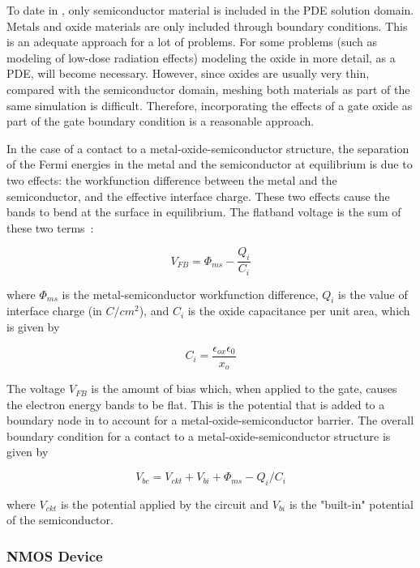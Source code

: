 To date in \Xyce{}, only semiconductor material is included in the PDE
solution domain.  Metals and oxide materials are only included
through boundary conditions.  This is an adequate approach for a lot of
problems.  For some problems (such as modeling of low-dose radiation
effects) modeling the oxide in more detail, as a PDE, will become necessary.
However, since oxides are usually very thin, compared with the
semiconductor domain, meshing both materials as part of the same simulation
is difficult.  Therefore, incorporating the effects of a gate oxide as part
of the gate boundary condition is a reasonable approach.

In the case of a contact to a metal-oxide-semiconductor structure, the
separation of the Fermi energies in the metal and the semiconductor at
equilibrium is due to two effects:  the workfunction difference between the
metal and the semiconductor, and the effective interface charge.  These two
effects cause the bands to bend at the surface in equilibrium.  The
flatband voltage is the sum of these two terms~\cite{streetman}:

\begin{equation}
  V_{FB} = \Phi_{ms} - \frac{Q_{i}}{C_{i}}
\end{equation}

where $\Phi_{ms}$ is the metal-semiconductor workfunction difference,
$Q_{i}$ is the value of interface charge (in $C/cm^{2}$), and $C_{i}$ is the
oxide capacitance per unit area, which is given by

\begin{equation}
  C_{i} = \frac{\epsilon_{ox} \epsilon_{0}}{x_{o}}
\end{equation}

The voltage $V_{FB}$ is the amount of bias which, when applied to the gate,
causes the electron energy bands to be flat.  This is the potential
that is added to a boundary node in \Xyce{} to account for a metal-oxide-semiconductor
barrier.  The overall boundary condition for a contact to a
metal-oxide-semiconductor structure is given by

\begin{equation}
  V_{bc} = V_{ckt} + V_{bi} + \Phi_{ms} - Q_{i}/C_{i}
\end{equation}

where $V_{ckt}$ is the potential applied by the circuit and $V_{bi}$ is the
"built-in" potential of the semiconductor.

\subsubsection{NMOS Device}

